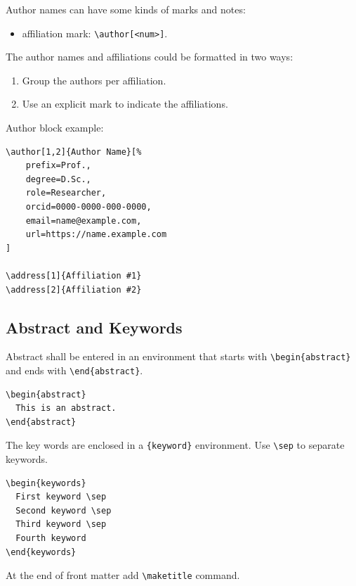 \documentclass[
twocolumn,
]{ceurart}
\begin{document}
Author names can have some kinds of marks and notes:
\begin{itemize}
\item affiliation mark: \verb|\author[<num>]|.
\end{itemize}

The author names and affiliations could be formatted in two ways:
\begin{enumerate}
\item Group the authors per affiliation.
\item Use an explicit mark to indicate the affiliations.
\end{enumerate}

Author block example:
\begin{verbatim}
\author[1,2]{Author Name}[%
    prefix=Prof.,
    degree=D.Sc.,
    role=Researcher,
    orcid=0000-0000-000-0000,
    email=name@example.com,
    url=https://name.example.com
]

\address[1]{Affiliation #1}
\address[2]{Affiliation #2}
\end{verbatim}

\subsection{Abstract and Keywords}

Abstract shall be entered in an environment that starts
with \verb|\begin{abstract}| and ends with
\verb|\end{abstract}|. 

\begin{verbatim}
\begin{abstract}
  This is an abstract.
\end{abstract}
\end{verbatim}

The key words are enclosed in a \verb|{keyword}|
environment. Use \verb|\sep| to separate keywords.

\begin{verbatim}
\begin{keywords}
  First keyword \sep 
  Second keyword \sep 
  Third keyword \sep 
  Fourth keyword
\end{keywords}
\end{verbatim}

At the end of front matter add \verb|\maketitle| command.
\end{document}
